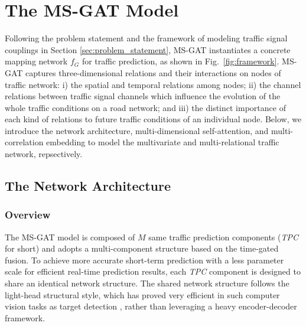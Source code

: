 \section{The MS-GAT Model}
\label{sec:the_ms-gat_model}

Following the problem statement and the framework of modeling traffic signal couplings in Section \ref{sec:problem_statement}, MS-GAT instantiates a concrete mapping network $f_G$ for traffic prediction, as shown in Fig.~\ref{fig:framework}. MS-GAT captures three-dimensional relations and their interactions on nodes of traffic network: i) the spatial and temporal relations among nodes; ii) the channel relations between traffic signal channels which influence the evolution of the whole traffic conditions on a road network; and iii) the distinct importance of each kind of relations to future traffic conditions of an individual node. Below, we introduce the network architecture, multi-dimensional self-attention, and multi-correlation embedding to model the multivariate and multi-relational traffic network, repsectively. 

\subsection{The Network Architecture}
\label{ssec:the_network_architecture}

\subsubsection{Overview}
The MS-GAT model is composed of $M$ same traffic prediction components (\textit{TPC} for short) and adopts a multi-component structure based on the time-gated fusion. To achieve more accurate short-term prediction with a less parameter scale for efficient real-time prediction results, each \textit{TPC} component is designed to share an identical network structure. The shared network structure follows the light-head structural style, which has proved very efficient in such computer vision tasks as target detection \cite{li2017light}, rather than leveraging a heavy encoder-decoder framework.

